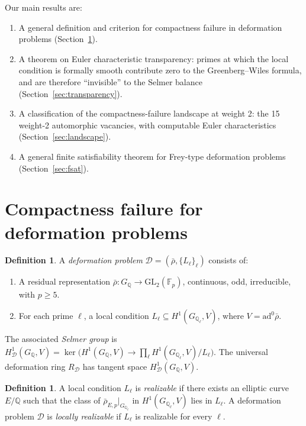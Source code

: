 \documentclass[12pt]{amsart}
\theoremstyle{definition}
\newtheorem{definition}[theorem]{Definition}
\theoremstyle{remark}
\newcommand{\GL}{\mathrm{GL}}
\newcommand{\ad}{\mathrm{ad}}
\newcommand{\rhobar}{\bar{\rho}}
\newcommand{\Fp}{\mathbb{F}_p}
\newcommand{\GQ}{G_{\mathbb{Q}}}
\newcommand{\GQl}{G_{\mathbb{Q}_\ell}}
\begin{document}
Our main results are:
\begin{enumerate}[label=(\roman*)]
\item A general definition and criterion for compactness failure in deformation problems (Section~\ref{sec:compactness}).
\item A theorem on Euler characteristic transparency: primes at which the local condition is formally smooth contribute zero to the Greenberg--Wiles formula, and are therefore ``invisible'' to the Selmer balance (Section~\ref{sec:transparency}).
\item A classification of the compactness-failure landscape at weight 2: the 15 weight-2 automorphic vacancies, with computable Euler characteristics (Section~\ref{sec:landscape}).
\item A general finite satisfiability theorem for Frey-type deformation problems (Section~\ref{sec:fsat}).
\end{enumerate}

\section{Compactness failure for deformation problems}
\label{sec:compactness}

\begin{definition}\label{def:deformation-problem}
A \emph{deformation problem} $\mathcal{D} = (\rhobar, \{L_\ell\}_\ell)$ consists of:
\begin{enumerate}[label=(\alph*)]
\item A residual representation $\rhobar : \GQ \to \GL_2(\Fp)$, continuous, odd, irreducible, with $p \geq 5$.
\item For each prime $\ell$, a local condition $L_\ell \subseteq H^1(\GQl, V)$, where $V = \ad^0\rhobar$.
\end{enumerate}
The associated \emph{Selmer group} is $H^1_{\mathcal{D}}(\GQ, V) = \ker\bigl(H^1(\GQ, V) \to \prod_\ell H^1(\GQl, V) / L_\ell\bigr)$. The universal deformation ring $R_{\mathcal{D}}$ has tangent space $H^1_{\mathcal{D}}(\GQ, V)$.
\end{definition}

\begin{definition}\label{def:locally-realizable}
A local condition $L_\ell$ is \emph{realizable} if there exists an elliptic curve $E/\mathbb{Q}$ such that the class of $\rhobar_{E,p}|_{\GQl}$ in $H^1(\GQl, V)$ lies in $L_\ell$. A deformation problem $\mathcal{D}$ is \emph{locally realizable} if $L_\ell$ is realizable for every $\ell$.
\end{definition}
\end{document}

